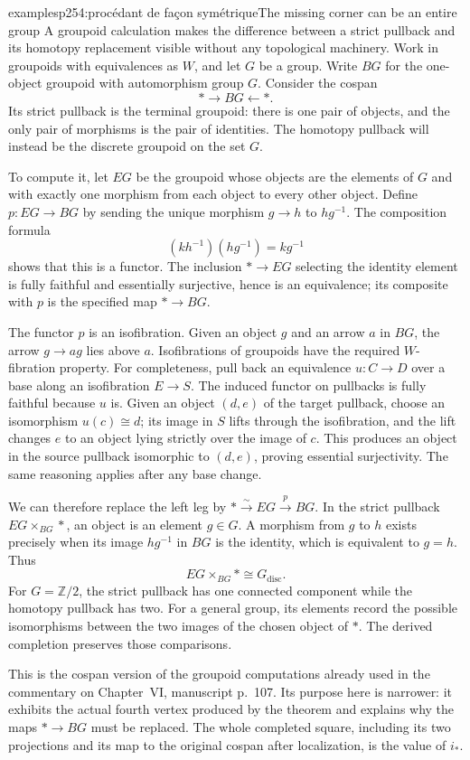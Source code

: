 \begin{dcomment}{examples}{p254:procédant de façon symétrique}{The missing corner can be an entire group}
A groupoid calculation makes the difference between a strict pullback and its homotopy replacement visible without any topological machinery. Work in groupoids with equivalences as $W$, and let $G$ be a group. Write $BG$ for the one-object groupoid with automorphism group $G$. Consider the cospan
\[
 *\longrightarrow BG\longleftarrow *.
\]
Its strict pullback is the terminal groupoid: there is one pair of objects, and the only pair of morphisms is the pair of identities. The homotopy pullback will instead be the discrete groupoid on the set $G$.

To compute it, let $EG$ be the groupoid whose objects are the elements of $G$ and with exactly one morphism from each object to every other object. Define $p:EG\to BG$ by sending the unique morphism $g\to h$ to $hg^{-1}$. The composition formula
\[
 (kh^{-1})(hg^{-1})=kg^{-1}
\]
shows that this is a functor. The inclusion $*\to EG$ selecting the identity element is fully faithful and essentially surjective, hence is an equivalence; its composite with $p$ is the specified map $*\to BG$.

The functor $p$ is an isofibration. Given an object $g$ and an arrow $a$ in $BG$, the arrow $g\to ag$ lies above $a$. Isofibrations of groupoids have the required $W$-fibration property. For completeness, pull back an equivalence $u:C\to D$ over a base along an isofibration $E\to S$. The induced functor on pullbacks is fully faithful because $u$ is. Given an object $(d,e)$ of the target pullback, choose an isomorphism $u(c)\cong d$; its image in $S$ lifts through the isofibration, and the lift changes $e$ to an object lying strictly over the image of $c$. This produces an object in the source pullback isomorphic to $(d,e)$, proving essential surjectivity. The same reasoning applies after any base change.

We can therefore replace the left leg by $*\xrightarrow{\sim}EG\xrightarrow p BG$. In the strict pullback $EG\times_{BG}*$, an object is an element $g\in G$. A morphism from $g$ to $h$ exists precisely when its image $hg^{-1}$ in $BG$ is the identity, which is equivalent to $g=h$. Thus
\[
 EG\times_{BG}*\cong G_{\mathrm{disc}}.
\]
For $G=\mathbb Z/2$, the strict pullback has one connected component while the homotopy pullback has two. For a general group, its elements record the possible isomorphisms between the two images of the chosen object of $*$. The derived completion preserves those comparisons.

This is the cospan version of the groupoid computations already used in the commentary on Chapter~VI, manuscript p.~107. Its purpose here is narrower: it exhibits the actual fourth vertex produced by the theorem and explains why the maps $*\to BG$ must be replaced. The whole completed square, including its two projections and its map to the original cospan after localization, is the value of $i_*$.
\end{dcomment}


